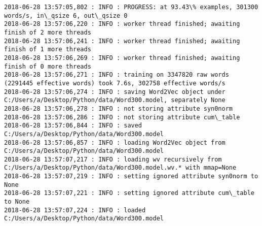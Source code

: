 \documentclass[11pt]{article}
\begin{document}
\begin{Verbatim}[commandchars=\\\{\}]
2018-06-28 13:57:05,802 : INFO : PROGRESS: at 93.43\% examples, 301300 words/s, in\_qsize 6, out\_qsize 0
2018-06-28 13:57:06,220 : INFO : worker thread finished; awaiting finish of 2 more threads
2018-06-28 13:57:06,241 : INFO : worker thread finished; awaiting finish of 1 more threads
2018-06-28 13:57:06,269 : INFO : worker thread finished; awaiting finish of 0 more threads
2018-06-28 13:57:06,271 : INFO : training on 3347820 raw words (2291445 effective words) took 7.6s, 302758 effective words/s
2018-06-28 13:57:06,274 : INFO : saving Word2Vec object under C:/Users/a/Desktop/Python/data/Word300.model, separately None
2018-06-28 13:57:06,278 : INFO : not storing attribute syn0norm
2018-06-28 13:57:06,286 : INFO : not storing attribute cum\_table
2018-06-28 13:57:06,844 : INFO : saved C:/Users/a/Desktop/Python/data/Word300.model
2018-06-28 13:57:06,857 : INFO : loading Word2Vec object from C:/Users/a/Desktop/Python/data/Word300.model
2018-06-28 13:57:07,217 : INFO : loading wv recursively from C:/Users/a/Desktop/Python/data/Word300.model.wv.* with mmap=None
2018-06-28 13:57:07,219 : INFO : setting ignored attribute syn0norm to None
2018-06-28 13:57:07,221 : INFO : setting ignored attribute cum\_table to None
2018-06-28 13:57:07,224 : INFO : loaded C:/Users/a/Desktop/Python/data/Word300.model

    \end{Verbatim}
\end{document}
